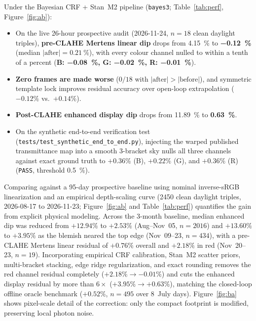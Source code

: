 \documentclass[11pt,a4paper]{article}
\newcommand{\code}[1]{\texttt{\small #1}}
\begin{document}
Under the Bayesian CRF + Stan~M2 pipeline (\code{bayes3}; Table~\ref{tab:perf},
Figure~\ref{fig:ab}):
\begin{itemize}
\item On the live 26-hour prospective audit (2026-11-24, $n=18$ clean daylight triples),
  \textbf{pre-CLAHE Mertens linear dip} drops from \SI{+4.15}{\percent} to
  \textbf{\SI{-0.12}{\percent}} (median $|\text{after}| = \SI{0.21}{\percent}$), with
  every colour channel nulled to within a tenth of a percent
  (\textbf{B: \SI{-0.08}{\percent}, G: \SI{-0.02}{\percent}, R: \SI{-0.01}{\percent}}).
\item \textbf{Zero frames are made worse} ($0/18$ with $|\text{after}| > |\text{before}|$),
  and symmetric template lock improves residual accuracy over open-loop extrapolation
  ($-0.12\%$ vs.\ $+0.14\%$).
\item \textbf{Post-CLAHE enhanced display dip} drops from \SI{+11.89}{\percent} to
  \textbf{\SI{+0.63}{\percent}}.
\item On the synthetic end-to-end verification test
  (\code{tests/test\_synthetic\_end\_to\_end.py}), injecting the warped published
  transmittance map into a smooth 3-bracket sky nulls all three channels against exact
  ground truth to $+0.36\%$ (B), $+0.22\%$ (G), and $+0.36\%$ (R) (\code{PASS},
  threshold \SI{0.5}{\percent}).
\end{itemize}

Comparing against a 95-day prospective baseline using nominal inverse-sRGB
linearization and an empirical depth-scaling curve (\num{2450} clean daylight triples,
2026-08-17 to 2026-11-23; Figure~\ref{fig:ab} and Table~\ref{tab:perf}) quantifies the
gain from explicit physical modeling. Across the 3-month baseline, median enhanced dip
was reduced from $+12.94\%$ to $+2.53\%$ (Aug--Nov~05, $n=2016$) and $+13.60\%$ to
$+3.95\%$ as the blemish neared the top edge (Nov~09--23, $n=434$), with a pre-CLAHE
Mertens linear residual of $+0.76\%$ overall and $+2.18\%$ in red (Nov~20--23, $n=19$).
Incorporating empirical CRF calibration, Stan~M2 scatter priors, multi-bracket stacking,
edge ridge regularization, and exact rounding removes the red channel residual
completely ($+2.18\% \to -0.01\%$) and cuts the enhanced display residual by more than
$6\times$ ($+3.95\% \to +0.63\%$), matching the closed-loop offline oracle benchmark
($+0.52\%$, $n=495$ over 8~July days). Figure~\ref{fig:ba} shows pixel-scale detail of
the correction: only the compact footprint is modified, preserving local photon noise.
\end{document}
